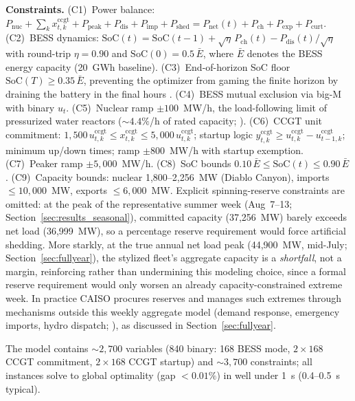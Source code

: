 \documentclass[preprint,12pt,authoryear]{elsarticle}
\begin{document}
\textbf{Constraints.}
(C1)~Power balance: $P_{\text{nuc}} + \sum_k x^{\text{ccgt}}_{t,k} + P_{\text{peak}} + P_{\text{dis}} + P_{\text{imp}} + P_{\text{shed}} = P_{\text{net}}(t) + P_{\text{ch}} + P_{\text{exp}} + P_{\text{curt}}$.
(C2)~BESS dynamics: $\mathrm{SoC}(t) = \mathrm{SoC}(t{-}1) + \sqrt{\eta}\,P_{\text{ch}}(t) - P_{\text{dis}}(t)/\sqrt{\eta}$ with round-trip $\eta = 0.90$ and $\mathrm{SoC}(0) = 0.5\,\bar{E}$, where $\bar{E}$ denotes the BESS energy capacity (20~GWh baseline).
(C3)~End-of-horizon SoC floor $\mathrm{SoC}(T) \geq 0.35\,\bar{E}$, preventing the optimizer from gaming the finite horizon by draining the battery in the final hours \citep{sioshansi2009}.
(C4)~BESS mutual exclusion via big-M with binary $u_t$.
(C5)~Nuclear ramp $\pm 100$~MW/h, the load-following limit of pressurized water reactors (${\sim}4.4\%$/h of rated capacity; \citealp{nea2011}).
(C6)~CCGT unit commitment: $1{,}500\,u^{\text{ccgt}}_{t,k} \leq x^{\text{ccgt}}_{t,k} \leq 5{,}000\,u^{\text{ccgt}}_{t,k}$; startup logic $y^{\text{ccgt}}_{t,k} \geq u^{\text{ccgt}}_{t,k} - u^{\text{ccgt}}_{t-1,k}$; minimum up/down times; ramp $\pm 800$~MW/h with startup exemption.
(C7)~Peaker ramp $\pm 5{,}000$~MW/h.
(C8)~SoC bounds $0.10\,\bar{E} \leq \mathrm{SoC}(t) \leq 0.90\,\bar{E}$.
(C9)~Capacity bounds: nuclear 1{,}800--2{,}256~MW (Diablo Canyon), imports $\leq 10{,}000$~MW, exports $\leq 6{,}000$~MW.
Explicit spinning-reserve constraints are omitted: at the peak of the representative summer week (Aug~7--13; Section~\ref{sec:results_seasonal}), committed capacity (37{,}256~MW) barely exceeds net load (36{,}999~MW), so a percentage reserve requirement would force artificial shedding. More starkly, at the true annual net load peak (44{,}900~MW, mid-July; Section~\ref{sec:fullyear}), the stylized fleet's aggregate capacity is a \emph{shortfall}, not a margin, reinforcing rather than undermining this modeling choice, since a formal reserve requirement would only worsen an already capacity-constrained extreme week. In practice CAISO procures reserves and manages such extremes through mechanisms outside this weekly aggregate model (demand response, emergency imports, hydro dispatch; \citealp{caiso2023}), as discussed in Section~\ref{sec:fullyear}.

The model contains ${\sim}2{,}700$ variables (840 binary: 168 BESS mode, $2\times168$ CCGT commitment, $2\times168$ CCGT startup) and ${\sim}3{,}700$ constraints; all instances solve to global optimality (gap $< 0.01\%$) in well under 1~s (0.4--0.5~s typical).
\end{document}
